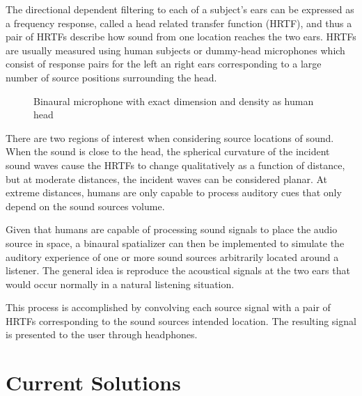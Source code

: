 \documentclass[12pt]{report}
\begin{document}
The directional dependent filtering to each of a subject's ears can be
expressed as a frequency response, called a head related transfer function (HRTF),
and thus a pair of HRTFs describe how sound from one location reaches the two ears.
HRTFs are usually measured using human subjects or dummy-head microphones which
consist of response pairs for the left an right ears corresponding to a large number
of source positions surrounding the head.

\begin{figure}[h!]
  \centering
  \caption{Binaural microphone with exact dimension and density as human head}
\end{figure}

There are two regions of interest when considering source locations of sound.  When the sound
is close to the head, the spherical curvature of the incident sound waves cause the HRTFs to change
qualitatively as a function of distance, but at moderate distances, the incident waves can be considered
planar. At extreme distances, humans are only capable to process auditory cues that only depend
on the sound sources volume.

Given that humans are capable of processing sound signals to place the audio source in space,
a binaural spatializer can then be implemented to simulate the auditory experience of one
or more sound sources arbitrarily located around a listener.  The general idea is reproduce
the acoustical signals at the two ears that would occur normally in a natural listening situation.

This process is accomplished by convolving each source signal with a pair of HRTFs corresponding to the
sound sources intended location.  The resulting signal is presented to the user through headphones.

\section{ Current Solutions}
\end{document}
